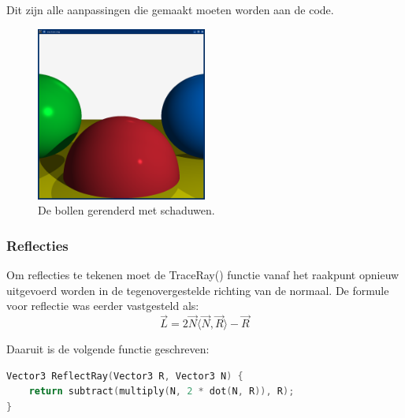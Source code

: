 \documentclass[12pt, a4paper]{article}
\newcommand*{\ora}{\overrightarrow}
\begin{document}
Dit zijn alle aanpassingen die gemaakt moeten worden aan de code.

\begin{figure}[h]
    \centering
    \includegraphics[width=0.50\textwidth]{renders/schaduw.png}
    \caption{De bollen gerenderd met schaduwen.}
    \label{fig:schaduw}
\end{figure}

\subsubsection{Reflecties}

Om reflecties te tekenen moet de TraceRay() functie vanaf het raakpunt opnieuw uitgevoerd worden in de tegenovergestelde richting van de normaal. De formule voor reflectie was eerder vastgesteld als:
\[\ora{L}=2\ora{N}\langle\ora{N},\ora{R}\rangle-\ora{R}\]

Daaruit is de volgende functie geschreven:

\begin{lstlisting}[language=C++]
Vector3 ReflectRay(Vector3 R, Vector3 N) {
    return subtract(multiply(N, 2 * dot(N, R)), R);
}
\end{lstlisting}
\end{document}
